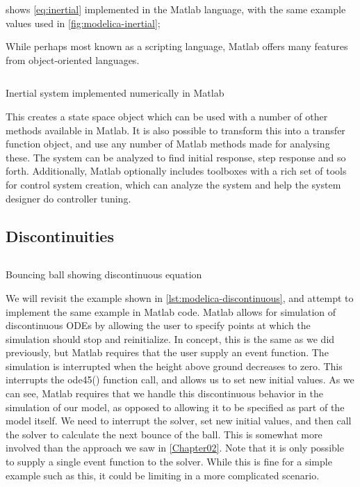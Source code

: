 \documentclass[\rootfolder/main.tex]{subfiles}
\begin{document}
 shows \cref{eq:inertial} implemented in the Matlab language, with the same example values used in \cref{fig:modelica-inertial};

While perhaps most known as a scripting language, Matlab offers many features from object-oriented languages.

\begin{listing}[ht]
    \inputminted[fontsize=\footnotesize, firstline=1, lastline=9]{matlab}{\rootfolder/Models/Matlab/InertialMatlab.m}
    \caption{Inertial system implemented numerically in Matlab\label{lst:matlab-inertial}}
\end{listing}

This creates a state space object which can be used with a number of other methods available in Matlab.
It is also possible to transform this into a transfer function object, and use any number of Matlab methods made for analysing these.
The system can be analyzed to find initial response, step response and so forth.
Additionally, Matlab optionally includes toolboxes with a rich set of tools for control system creation, which can analyze the system and help the system designer do controller tuning.

\subsection{Discontinuities}

\begin{listing}[ht]
    \inputminted[fontsize=\footnotesize]{matlab}{\rootfolder/Models/Matlab/BouncingBall.m}
    \caption{Bouncing ball showing discontinuous equation\label{lst:matlab-discontinuous}}
\end{listing}

We will revisit the example shown in \cref{lst:modelica-discontinuous}, and attempt to implement the same example in Matlab code.
Matlab allows for simulation of discontinuous ODEs by allowing the user to specify points at which the simulation should stop and reinitialize.
In concept, this is the same as we did previously, but Matlab requires that the user supply an event function.
The simulation is interrupted when the height above ground decreases to zero.
This interrupts the ode45() function call, and allows us to set new initial values.
As we can see, Matlab requires that we handle this discontinuous behavior in the simulation of our model, as opposed to allowing it to be specified as part of the model itself.
We need to interrupt the solver, set new initial values, and then call the solver to calculate the next bounce of the ball.
This is somewhat more involved than the approach we saw in \cref{Chapter02}.
Note that it is only possible to supply a single event function to the solver.
While this is fine for a simple example such as this, it could be limiting in a more complicated scenario.
\end{document}
